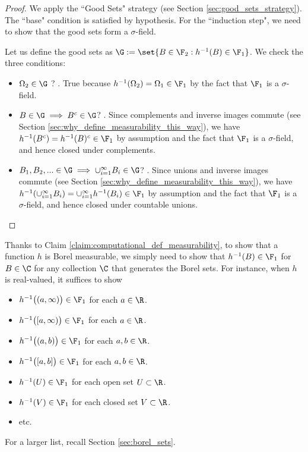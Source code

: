 \documentclass{article} %
\begin{document}
\begin{proof}
We apply the ``Good Sets" strategy (see Section \ref{sec:good_sets_strategy}).  The ``base" condition is satisfied by hypothesis.  For the ``induction step", we need to show that the good sets form a $\sigma$-field.

Let us define the good sets as $\G := \set{B \in \F_2 : h^{-1}(B) \in \F_1}$.  We check the three conditions:
\begin{itemize}
\item $\Omega_2 \in \G$	? \greencheck.  True because $h^{-1}(\Omega_2) = \Omega_1 \in \F_1$ by  the fact that $\F_1$ is a $\sigma$-field.
\item $B \in \G \implies B^c \in \G$? \greencheck.  Since complements and inverse images commute (see Section \ref{sec:why_define_measurability_this_way}), we have $h^{-1}(B^c) = h^{-1}(B)^c \in \F_1$ by assumption and the fact that $\F_1$ is a $\sigma$-field, and hence closed under complements.
\item $B_1, B_2, ... \in \G \implies \cup_{i=1}^\infty B_i \in \G$? \greencheck.  Since unions and inverse images commute (see Section \ref{sec:why_define_measurability_this_way}), we have $h^{-1}(\cup_{i=1}^\infty B_i) = \cup_{i=1}^\infty h^{-1}(B_i) \in \F_1$ by assumption and the fact that $\F_1$ is a $\sigma$-field, and hence closed under countable unions.   
\end{itemize}

\end{proof}





\begin{remark}{}
Thanks to Claim \ref{claim:computational_def_measurability}, to show that a function $h$ is Borel measurable, we simply need to show that $h^{-1}(B) \in \F_1$ for $B \in \C$ for any collection $\C$ that generates the Borel sets. For instance, when $h$ is real-valued, it suffices to show
\begin{itemize}
\item $h^{-1}\big((a,\infty)\big) \in \F_1$ for each $a \in \R$.
\item $h^{-1}\big([a,\infty)\big) \in \F_1$ for each $a \in \R$.
\item $h^{-1}\big((a,b)\big) \in \F_1$ for each $a,b \in \R$.
\item $h^{-1}\big([a,b]\big) \in \F_1$ for each $a,b \in \R$.
\item $h^{-1}(U) \in \F_1$ for each open set $U \subset \R$.
\item $h^{-1}(V) \in \F_1$ for each closed set $V \subset \R$.
\item etc.
\end{itemize}
For a larger list, recall Section \ref{sec:borel_sets}. 
\label{rk:computational_definition_of_Borel_measurability}
\end{remark}
\end{document}
